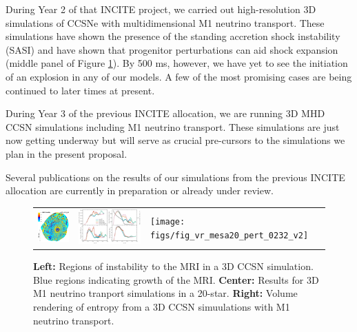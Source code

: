 During Year 2 of that INCITE project, we carried out high-resolution 3D simulations of CCSNe with multidimensional M1 neutrino transport.
These simulations have shown the presence of the standing accretion shock instability (SASI) and have shown that progenitor perturbations can aid shock expansion (middle panel of Figure \ref{fig:incite2015}).
By 500 ms, however, we have yet to see the initiation of an explosion in any of our models.
A few of the most promising cases are being continued to later times at present.

During Year 3 of the previous INCITE allocation, we are running 3D MHD CCSN simulations including M1 neutrino transport.
These simulations are just now getting underway but will serve as crucial pre-cursors to the simulations we plan in the present proposal.

Several publications on the results of our simulations from the previous INCITE allocation are currently in preparation or already under review.

\begin{figure}
  \centering
  \begin{tabular}{lll}
    \includegraphics[width=1.5in]{figs/o110b9_C90_0566} &
    \includegraphics[width=3in]{figs/mesa20vsPert} &
    \texttt{[image: figs/fig\_vr\_mesa20\_pert\_0232\_v2]}
  \end{tabular}
  \caption{{\bf Left:} Regions of instability to the MRI in a 3D CCSN simulation. Blue regions indicating growth of the MRI. {\bf Center:} Results for 3D M1 neutrino tranport simulations in a 20-\msun star. {\bf Right:} Volume rendering of entropy from a 3D CCSN simuulations with M1 neutrino transport.}
  \label{fig:incite2015}
\end{figure}

